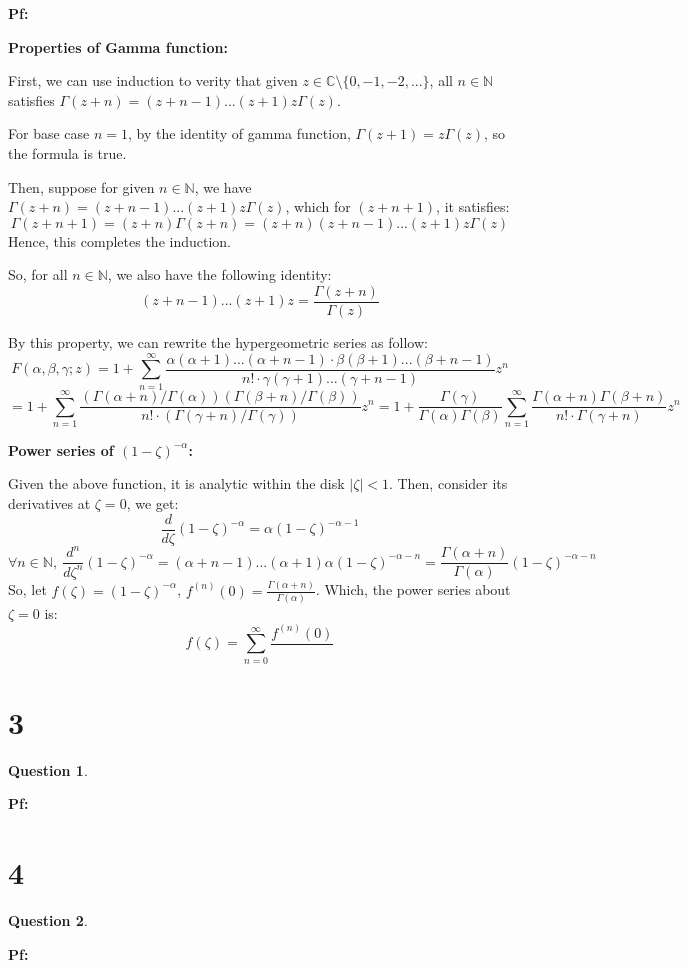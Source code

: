 \documentclass{article}
\newtheorem{question}{Question}
\begin{document}
\textbf{Pf:}

\textbf{Properties of Gamma function:}

First, we can use induction to verity that given $z\in \mathbb{C}\setminus\{0,-1,-2,...\}$, all $n\in\mathbb{N}$ satisfies $\Gamma(z+n)=(z+n-1)...(z+1)z\Gamma(z)$. 

For base case $n=1$, by the identity of gamma function, $\Gamma(z+1)=z\Gamma(z)$, so the formula is true.

Then, suppose for given $n\in\mathbb{N}$, we have $\Gamma(z+n)=(z+n-1)...(z+1)z\Gamma(z)$, which for $(z+n+1)$, it satisfies:
$$\Gamma(z+n+1)=(z+n)\Gamma(z+n)=(z+n)(z+n-1)...(z+1)z\Gamma(z)$$
Hence, this completes the induction.

So, for all $n\in\mathbb{N}$, we also have the following identity:
$$(z+n-1)...(z+1)z = \frac{\Gamma(z+n)}{\Gamma(z)}$$

By this property, we can rewrite the hypergeometric series as follow:
$$F(\alpha,\beta,\gamma;z)=1+\sum_{n=1}^{\infty}\frac{\alpha(\alpha+1)...(\alpha+n-1)\cdot \beta(\beta+1)...(\beta+n-1)}{n!\cdot \gamma(\gamma+1)...(\gamma+n-1)}z^n $$
$$= 1+\sum_{n=1}^{\infty}\frac{(\Gamma(\alpha+n)/\Gamma(\alpha))(\Gamma(\beta+n)/\Gamma(\beta))}{n!\cdot (\Gamma(\gamma+n)/\Gamma(\gamma))}z^n = 1+\frac{\Gamma(\gamma)}{\Gamma(\alpha)\Gamma(\beta)}\sum_{n=1}^{\infty}\frac{\Gamma(\alpha+n)\Gamma(\beta+n)}{n!\cdot \Gamma(\gamma+n)}z^n$$

\hfil

\textbf{Power series of $(1-\zeta)^{-\alpha}$:}

Given the above function, it is analytic within the disk $|\zeta|<1$. Then, consider its derivatives at $\zeta=0$, we get:
$$\frac{d}{d\zeta}(1-\zeta)^{-\alpha}=\alpha(1-\zeta)^{-\alpha-1}$$
$$\forall n\in\mathbb{N},\ \frac{d^n}{d\zeta^n}(1-\zeta)^{-\alpha}=(\alpha+n-1)...(\alpha+1)\alpha(1-\zeta)^{-\alpha-n}=\frac{\Gamma(\alpha+n)}{\Gamma(\alpha)}(1-\zeta)^{-\alpha-n}$$
So, let $f(\zeta)=(1-\zeta)^{-\alpha}$, $f^{(n)}(0)=\frac{\Gamma(\alpha+n)}{\Gamma(\alpha)}$. Which, the power series about $\zeta=0$ is:
$$f(\zeta)=\sum_{n=0}^{\infty}\frac{f^{(n)}(0)}{}$$

\break

\section*{3}
\begin{myBox}[]{}
    \begin{question}
        
    \end{question}
\end{myBox}

\textbf{Pf:}

\break

\section*{4}
\begin{myBox}[]{}
    \begin{question}
        
    \end{question}
\end{myBox}

\textbf{Pf:}
\end{document}
